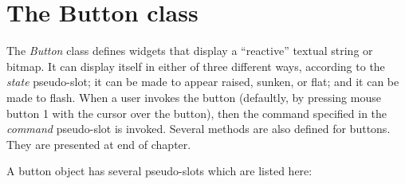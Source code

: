 \section{The Button class}

The {\em Button} class defines widgets that display a ``reactive'' textual
string or bitmap. It can display itself in either of three different ways,
according to the {\em state} pseudo-slot; it can be made to appear raised,
sunken, or flat; and it can be made to flash.  When a user invokes the button
(defaultly, by pressing mouse button 1 with the cursor over the button), then
the command specified in the {\em command} pseudo-slot is invoked. Several
methods are also defined for buttons. They are presented at end of chapter.

A button object has several pseudo-slots which are listed here:

